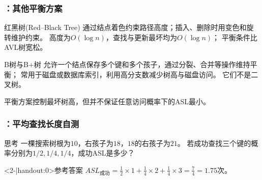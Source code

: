 \begin{frame}
    \frametitle{\insertsectionhead：其他平衡方案}
    \begin{block}{红黑树(Red--Black Tree)}
        通过结点着色约束路径高度；插入、删除时用变色和旋转维护约束。
        高度为$O(\log n)$，查找与更新最坏均为$O(\log n)$；
        平衡条件比AVL树宽松。
    \end{block}
    \begin{block}{B树与B$+$树}
        允许一个结点保存多个键和多个孩子，通过分裂、合并等操作维持平衡；
        常用于磁盘或数据库索引，利用高分支数减少树高与磁盘访问。
        它们不是二叉树。
    \end{block}
    \small 平衡方案控制最坏树高，但并不保证任意访问概率下的ASL最小。
\end{frame}

\begin{frame}
    \frametitle{\insertsectionhead：平均查找长度自测}
    \begin{alertblock}{思考}
        一棵搜索树根为$10$，右孩子为$18$，$18$的右孩子为$21$。
        若成功查找三个键的概率分别为$1/2,1/4,1/4$，成功ASL是多少？
    \end{alertblock}
    \begin{block}<2-|handout:0>{参考答案}
        $ASL_{\mathrm{成功}}=\frac12\times1+\frac14\times2+
        \frac14\times3=\frac74=1.75$次。
    \end{block}
\end{frame}
